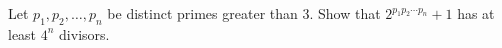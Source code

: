 Let $p_1, p_2, \ldots, p_n$ be distinct primes greater than 3. Show that $2^{p_1 p_2 \cdots p_n} + 1$ has at least $4^n$ divisors.
